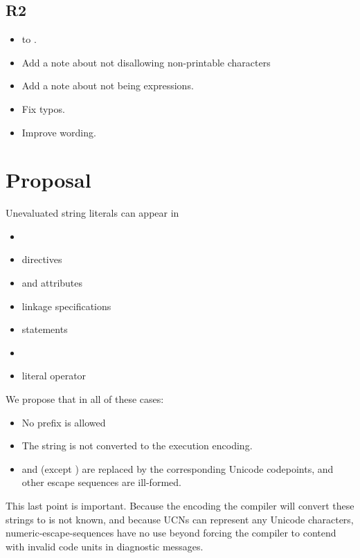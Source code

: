 \documentclass{wg21}
\begin{document}
\subsection{R2}
\begin{itemize}
    \item {} to .
    \item Add a note about not disallowing non-printable characters
    \item Add a note about  not being expressions.
    \item Fix typos.
    \item Improve wording.
\end{itemize}

\section{Proposal}

Unevaluated string literals can appear in

\begin{itemize}
\item {}
\item {} directives
\item \tcode{[[nodiscard]]} and \tcode{[[deprecated]]} attributes
\item {} linkage specifications
\item {} statements
\item {}
\item literal operator
\end{itemize}

We propose that in all of these cases:
\begin{itemize}
\item No prefix is allowed
\item The string is not converted to the execution encoding.
\item {} and  (except  ) are replaced by
the corresponding Unicode codepoints, and other escape sequences are ill-formed.
\end{itemize}

This last point is important. Because the encoding the compiler will convert these strings to is not known, and because UCNs can represent any Unicode characters,
numeric-escape-sequences have no use beyond forcing the compiler to contend with invalid
code units in diagnostic messages.
\end{document}
